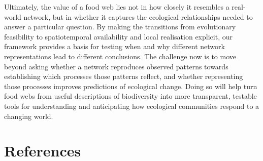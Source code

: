 \documentclass[
]{article}
\begin{document}
Ultimately, the value of a food web lies not in how closely it resembles
a real-world network, but in whether it captures the ecological
relationships needed to answer a particular question. By making the
transitions from evolutionary feasibility to spatiotemporal availability
and local realisation explicit, our framework provides a basis for
testing when and why different network representations lead to different
conclusions. The challenge now is to move beyond asking whether a
network reproduces observed patterns towards establishing which
processes those patterns reflect, and whether representing those
processes improves predictions of ecological change. Doing so will help
turn food webs from useful descriptions of biodiversity into more
transparent, testable tools for understanding and anticipating how
ecological communities respond to a changing world.

\section*{References}\label{references}
\end{document}
